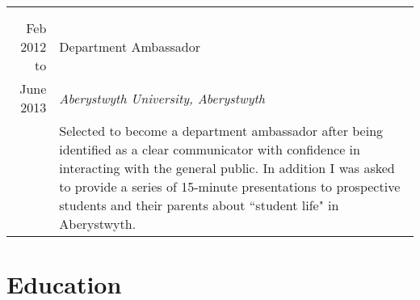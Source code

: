 \documentclass[a4paper, 10pt]{extarticle} %
\begin{document}
\begin{longtable}{r | p{13cm}}
{\begin{itemize}[leftmargin=*]
\vspace{-0.3cm}

\end{itemize}

}

\\


\multicolumn{2}{c}{} \\

		Feb 2012 to
		
		 & 
		 
		 Department Ambassador  \\
		 
			June 2013
		 
		& 
		 
		\textit{Aberystwyth University, Aberystwyth} \\ 
		
& 

\footnotesize{Selected to become a department ambassador after being identified as a clear communicator with confidence in interacting with the general public. In addition I was asked to provide a series of 15-minute presentations to prospective students and their parents about ``student life" in Aberystwyth. 

\vspace{-0.3cm}

} \vspace{-0.3cm} \\

\end{longtable}


\section{Education}
\end{document}
